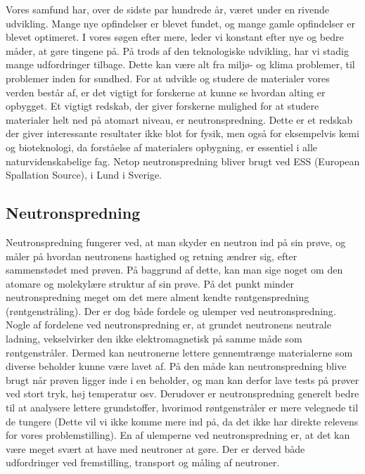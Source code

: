 \documentclass[12pt,oneside,a4paper]{article}
\begin{document}
{{{{{Vores samfund har, over de sidste par hundrede år, været under en rivende udvikling. Mange nye opfindelser er blevet fundet, og mange gamle opfindelser er blevet optimeret. I vores søgen efter mere, leder vi konstant efter nye og bedre måder, at gøre tingene på. På trods af den teknologiske udvikling, har vi stadig mange udfordringer tilbage. Dette kan være alt fra miljø- og klima problemer, til problemer inden for sundhed. For at udvikle og studere de materialer vores verden består af, er det vigtigt for forskerne at kunne se hvordan alting er opbygget. Et vigtigt redskab, der giver forskerne mulighed for at studere materialer helt ned på atomart niveau, er neutronspredning. Dette er et redskab der giver interessante resultater ikke blot for fysik, men også for eksempelvis kemi og bioteknologi, da forståelse af materialers opbygning, er essentiel i alle naturvidenskabelige fag. Netop neutronspredning bliver brugt ved ESS (European Spallation Source), i Lund i Sverige. \cite{ess_folder}

\subsection{Neutronspredning}
Neutronspredning fungerer ved, at man skyder en neutron ind på sin prøve, og måler på hvordan neutronens hastighed og retning ændrer sig, efter sammenstødet med prøven. På baggrund af dette, kan man sige noget om den atomare og molekylære struktur af sin prøve. På det punkt minder neutronspredning meget om det mere alment kendte røntgenspredning (røntgenstråling). Der er dog både fordele og ulemper ved neutronspredning. Nogle af fordelene ved neutronspredning er, at grundet neutronens neutrale ladning, vekselvirker den ikke elektromagnetisk på samme måde som røntgenstråler. Dermed kan neutronerne lettere gennemtrænge materialerne som diverse beholder kunne være lavet af. På den måde kan neutronspredning blive brugt når prøven ligger inde i en beholder, og man kan derfor lave tests på prøver ved stort tryk, høj temperatur osv. Derudover er neutronspredning generelt bedre til at analysere lettere grundstoffer, hvorimod røntgenstråler er mere velegnede til de tungere (Dette vil vi ikke komme mere ind på, da det ikke har direkte relevens for vores problemstilling). En af ulemperne ved neutronspredning er, at det kan være meget svært at have med neutroner at gøre. Der er derved både udfordringer ved fremstilling, transport og måling af neutroner.

}}}}}
\end{document}
